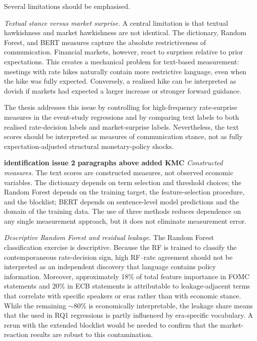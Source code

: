 Several limitations should be emphasised.

\emph{Textual stance versus market surprise.}
A central limitation is that textual hawkishness and market hawkishness
are not identical. The dictionary, Random Forest, and BERT measures
capture the absolute restrictiveness of communication. Financial markets,
however, react to surprises relative to prior expectations. This creates
a mechanical problem for text-based measurement: meetings with rate hikes
naturally contain more restrictive language, even when the hike was fully
expected. Conversely, a realised hike can be interpreted as dovish if
markets had expected a larger increase or stronger forward guidance.

The thesis addresses this issue by controlling for high-frequency
rate-surprise measures in the event-study regressions and by comparing
text labels to both realised rate-decision labels and market-surprise
labels. Nevertheless, the text scores should be interpreted as measures
of communication stance, not as fully expectation-adjusted structural
monetary-policy shocks.

\textbf{identification issue 2 paragraphs above added KMC 
}
\emph{Constructed measures.}
The text scores are constructed measures, not observed economic variables. The
dictionary depends on term selection and threshold choices; the Random Forest
depends on the training target, the feature-selection procedure, and the
blocklist; BERT depends on sentence-level model predictions and the
domain of the training data. The use of three methods reduces dependence on any
single measurement approach, but it does not eliminate measurement error.

\emph{Descriptive Random Forest and residual leakage.}
The Random Forest classification exercise is descriptive. Because the RF is
trained to classify the contemporaneous rate-decision sign, high RF--rate
agreement should not be interpreted as an independent discovery that language
contains policy information. Moreover, approximately 18\% of total feature
importance in FOMC statements and 20\% in ECB statements is attributable to
leakage-adjacent terms that correlate with specific speakers or eras rather than
with economic stance. While the remaining $\sim$80\% is economically
interpretable, the leakage share means that the \rfscore{} used in RQ1
regressions is partly influenced by era-specific vocabulary. A rerun with the
extended blocklist would be needed to confirm that the market-reaction results
are robust to this contamination.

